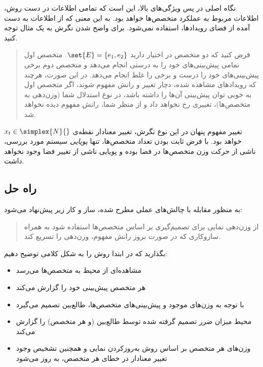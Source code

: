 نگاه اصلی در پس ویژگی‌های بالا، این است که تمامی اطلاعات در دست روش، اطلاعات مربوط به عملکرد متخصص‌ها خواهد بود. به این معنی که از اطلاعات به دست آمده از فضای رویدادها، استفاده نمی‌شود. برای واضح شدن نگرش به یک مثال توجه کنید.
\begin{quote}
فرض کنید که دو متخصص در اختیار دارید 
$\set{E} = \{ e_1, e_2 \}$. 
متخصص اول تمامی پیش‌بینی‌های خود را به درستی انجام می‌دهد و متخصص دوم برخی پیش‌بینی‌های خود را درست و برخی را غلط انجام می‌دهد. در این صورت، هرچند که رویدادهای مشاهده شده، دچار تغییر و رانش مفهوم شوند، اگر متخصص اول به خوبی توان پیش‌بینی آن‌ها را داشته باشد، در نوع استدلال شما (وزن‌دهی به متخصص‌ها)، تغییری رخ نخواهد داد و از منظر شما، رانش مفهوم دیده نخواهد شد.
\end{quote}

تغییر مفهوم پنهان در این نوع نگرش، تغییر معنادار نقطه‌ی 
$x_t \in \simplex{N}{}$ 
خواهد بود. با فرض ثابت بودن تعداد متخصص‌ها، تنها 
\textit{
پویایی
} 
سیستم مورد بررسی، ناشی از حرکت وزن متخصص‌ها در فضا بوده و پویایی ناشی از تغییر فضا وجود نخواهد داشت.

\subsection{
راه حل
}
به منظور مقابله با چالش‌های عملی مطرح شده، ساز و کار زیر پیش‌نهاد می‌شود:
\begin{quote}
از وزن‌دهی نمایی برای تصمیم‌گیری بر اساس متخصص‌ها استفاده شود به همراه سازوکاری که در صورت بروز رانش مفهوم، وزن‌دهی را تسریع کند.
\end{quote}

بگذارید که در ابتدا روش را به شکل کلامی توضیح دهیم:
\begin{itemize}
\item 
مشاهده‌ای از محیط به متخصص‌ها می‌رسد
\item 
هر متخصص پیش‌بینی خود را گزارش می‌کند
\item 
با توجه به وزن‌های موجود و پیش‌بینی‌های متخصص‌ها، طالع‌بین تصمیم می‌گیرد
\item 
محیط میزان ضرر تصمیم گرفته شده توسط طالع‌بین (و هر متخصص) را گزارش می‌کند
\item 
وزن‌های هر متخصص بر اساس روش به‌روزکردن نمایی و همچنین تشخیص وجود تغییر معنادار در خطای هر متخصص، به روز می‌شود
\end{itemize}

